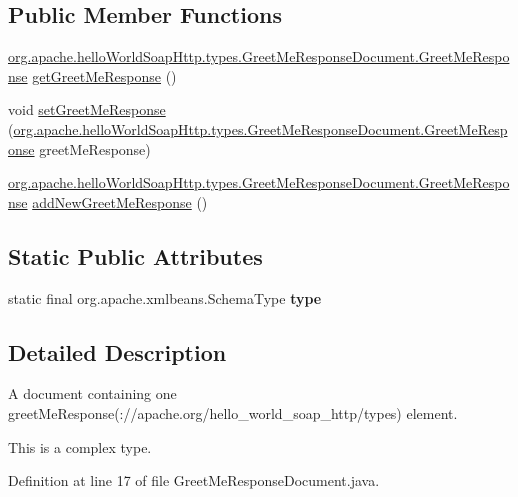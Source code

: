 \subsection*{Public Member Functions}
\begin{DoxyCompactItemize}
\item 
\hyperlink{interfaceorg_1_1apache_1_1hello_world_soap_http_1_1types_1_1_greet_me_response_document_1_1_greet_me_response}{org.\+apache.\+hello\+World\+Soap\+Http.\+types.\+Greet\+Me\+Response\+Document.\+Greet\+Me\+Response} \hyperlink{interfaceorg_1_1apache_1_1hello_world_soap_http_1_1types_1_1_greet_me_response_document_a2b38dad654d8bfc1be383937ebf7030a}{get\+Greet\+Me\+Response} ()
\item 
void \hyperlink{interfaceorg_1_1apache_1_1hello_world_soap_http_1_1types_1_1_greet_me_response_document_aec66bd3080b0476b7e8a6e4623b2aff2}{set\+Greet\+Me\+Response} (\hyperlink{interfaceorg_1_1apache_1_1hello_world_soap_http_1_1types_1_1_greet_me_response_document_1_1_greet_me_response}{org.\+apache.\+hello\+World\+Soap\+Http.\+types.\+Greet\+Me\+Response\+Document.\+Greet\+Me\+Response} greet\+Me\+Response)
\item 
\hyperlink{interfaceorg_1_1apache_1_1hello_world_soap_http_1_1types_1_1_greet_me_response_document_1_1_greet_me_response}{org.\+apache.\+hello\+World\+Soap\+Http.\+types.\+Greet\+Me\+Response\+Document.\+Greet\+Me\+Response} \hyperlink{interfaceorg_1_1apache_1_1hello_world_soap_http_1_1types_1_1_greet_me_response_document_abdfcf0fdd457c9dd9abdc6cd3b21e570}{add\+New\+Greet\+Me\+Response} ()
\end{DoxyCompactItemize}
\subsection*{Static Public Attributes}
\begin{DoxyCompactItemize}
\item 
static final org.\+apache.\+xmlbeans.\+Schema\+Type {\bfseries type}
\end{DoxyCompactItemize}


\subsection{Detailed Description}
A document containing one greet\+Me\+Response(\+://apache.org/hello\+\_\+world\+\_\+soap\+\_\+http/types) element.

This is a complex type. 

Definition at line 17 of file Greet\+Me\+Response\+Document.\+java.



